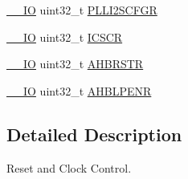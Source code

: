 \begin{DoxyCompactItemize}
\hyperlink{group___c_m_s_i_s__core__definitions_gaec43007d9998a0a0e01faede4133d6be}{\-\_\-\-\_\-\-I\-O} uint32\-\_\-t \hyperlink{struct_r_c_c___type_def_ac3beb02dccd9131d6ce55bb29c5fa69f}{P\-L\-L\-I2\-S\-C\-F\-G\-R}
\item 
\hyperlink{group___c_m_s_i_s__core__definitions_gaec43007d9998a0a0e01faede4133d6be}{\-\_\-\-\_\-\-I\-O} uint32\-\_\-t \hyperlink{struct_r_c_c___type_def_a5aa77c68f2409fff241e949f3d6129b5}{I\-C\-S\-C\-R}
\item 
\hyperlink{group___c_m_s_i_s__core__definitions_gaec43007d9998a0a0e01faede4133d6be}{\-\_\-\-\_\-\-I\-O} uint32\-\_\-t \hyperlink{struct_r_c_c___type_def_a46a098b026c5e85770e7a7f05a35d49c}{A\-H\-B\-R\-S\-T\-R}
\item 
\hyperlink{group___c_m_s_i_s__core__definitions_gaec43007d9998a0a0e01faede4133d6be}{\-\_\-\-\_\-\-I\-O} uint32\-\_\-t \hyperlink{struct_r_c_c___type_def_a5a89bd730b7710a0e24d068cb6e4c90f}{A\-H\-B\-L\-P\-E\-N\-R}
\end{DoxyCompactItemize}


\subsection{Detailed Description}
Reset and Clock Control. 

